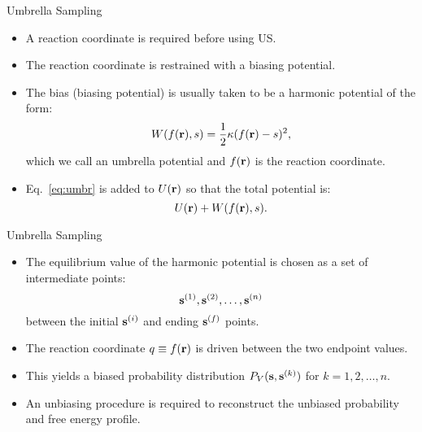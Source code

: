 \documentclass[10pt]{beamer}
\begin{document}
\begin{frame}{Umbrella Sampling}
\begin{itemize}
\setlength\itemsep{1em}
  \item A reaction coordinate is required before using US.
  \item The reaction coordinate is restrained with a biasing potential.
  \item The bias (biasing potential) is usually taken to be a harmonic potential of the form:
  \begin{equation}
    W(f({\bf r}), s) = \frac{1}{2}\kappa(f({\bf r})-s)^2,
    \label{eq:umbr}
  \end{equation}
  which we call an umbrella potential and $f({\bf r})$ is the reaction coordinate.
  \item Eq.~\ref{eq:umbr} is added to $U({\bf r})$ so that the total potential is:
  \begin{equation}
    U({\bf r}) + W(f({\bf r}),s).
  \end{equation}
\end{itemize}
\end{frame}

\begin{frame}{Umbrella Sampling}
\begin{itemize}
\setlength\itemsep{1em}
  \item The equilibrium value of the harmonic potential is chosen as a set of intermediate points:
  \begin{equation}
    {\bf s}^{(1)}, {\bf s}^{(2)}, \dots, {\bf s}^{(n)}
  \end{equation}
  between the initial ${\bf s}^{(i)}$ and ending ${\bf s}^{(f)}$ points.
  \item The reaction coordinate $q\equiv f({\bf r})$ is driven between the two endpoint values.
  \item This yields a biased probability distribution $P_V({\bf s},{\bf s}^{(k)})$ for $k=1,2,\dots,n$.
  \item An unbiasing procedure is required to reconstruct the unbiased probability and free energy profile.
\end{itemize}
\end{frame}
\end{document}
